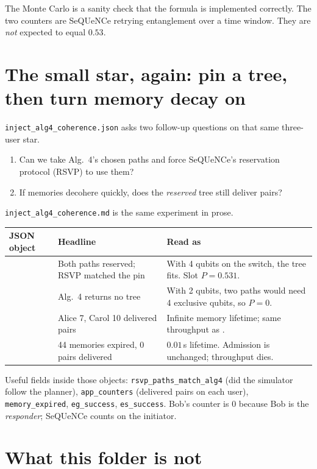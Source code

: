 \documentclass[11pt]{article}
\begin{document}
The Monte Carlo is a sanity check that the formula is implemented correctly.
The two counters are SeQUeNCe retrying entanglement over a time window.
They are \emph{not} expected to equal $0.53$.

\section{The small star, again: pin a tree, then turn memory decay on}

\texttt{inject\_alg4\_coherence.json} asks two follow-up questions on that same three-user star.

\begin{enumerate}
\item Can we take Alg.~4's chosen paths and force SeQUeNCe's reservation protocol (RSVP) to use them?
\item If memories decohere quickly, does the \emph{reserved} tree still deliver pairs?
\end{enumerate}

\texttt{inject\_alg4\_coherence.md} is the same experiment in prose.

{\small
\begin{tabularx}{\textwidth}{@{}P{1.35in} P{1.7in} Y@{}}
\toprule
JSON object & Headline & Read as \\
\midrule
{} & Both paths reserved; RSVP matched the pin & With 4 qubits on the switch, the tree fits. Slot $P=0.531$. \\
 & Alg.~4 returns no tree & With 2 qubits, two paths would need 4 exclusive qubits, so $P=0$. \\
 & Alice 7, Carol 10 delivered pairs & Infinite memory lifetime; same throughput as . \\
 & 44 memories expired, 0 pairs delivered & $0.01$\,s lifetime. Admission is unchanged; throughput dies. \\
\bottomrule
\end{tabularx}}

Useful fields inside those objects: \texttt{rsvp\_paths\_match\_alg4} (did the simulator follow the planner), \texttt{app\_counters} (delivered pairs on each user), \texttt{memory\_expired}, \texttt{eg\_success}, \texttt{es\_success}.
Bob's counter is 0 because Bob is the \emph{responder}; SeQUeNCe counts on the initiator.

\section{What this folder is not}
\end{document}
